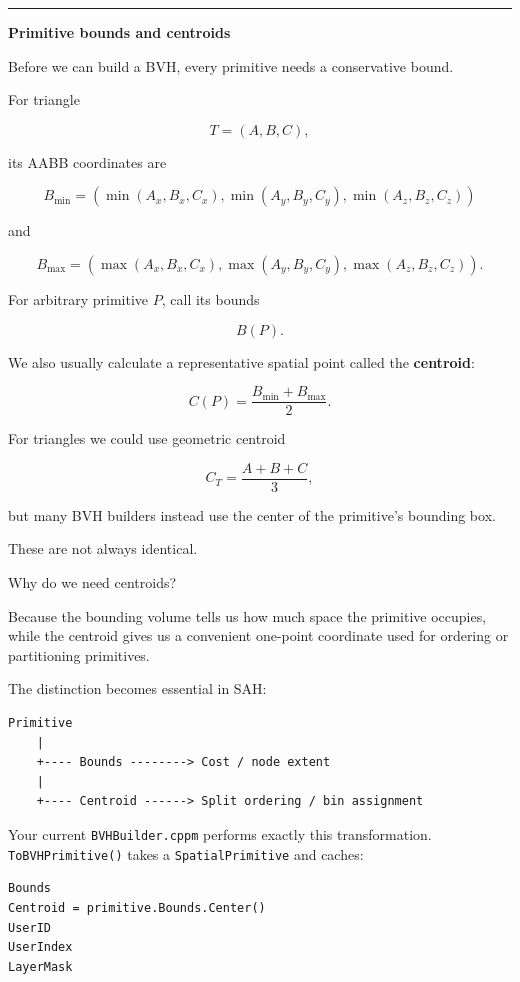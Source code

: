 \begin{center}\rule{0.5\linewidth}{0.5pt}\end{center}

\textbf{Primitive bounds and centroids}

Before we can build a BVH, every primitive needs a conservative bound.

For triangle

\[
T=(A,B,C),
\]

its AABB coordinates are

\[
B_{\min}=
\left(
\min(A_x,B_x,C_x),
\min(A_y,B_y,C_y),
\min(A_z,B_z,C_z)
\right)
\]

and

\[
B_{\max}=
\left(
\max(A_x,B_x,C_x),
\max(A_y,B_y,C_y),
\max(A_z,B_z,C_z)
\right).
\]

For arbitrary primitive \(P\), call its bounds

\[
B(P).
\]

We also usually calculate a representative spatial point called the \textbf{centroid}:

\[
C(P)=\frac{B_{\min}+B_{\max}}{2}.
\]

For triangles we could use geometric centroid

\[
C_T=\frac{A+B+C}{3},
\]

but many BVH builders instead use the center of the primitive's bounding box.

These are not always identical.

Why do we need centroids?

Because the bounding volume tells us how much space the primitive occupies, while the centroid gives us a convenient one-point coordinate used for ordering or partitioning primitives.

The distinction becomes essential in SAH:

\begin{verbatim}
Primitive
    |
    +---- Bounds --------> Cost / node extent
    |
    +---- Centroid ------> Split ordering / bin assignment
\end{verbatim}

Your current \texttt{BVHBuilder.cppm} performs exactly this transformation. \texttt{ToBVHPrimitive()} takes a \texttt{SpatialPrimitive} and caches:

\begin{verbatim}
Bounds
Centroid = primitive.Bounds.Center()
UserID
UserIndex
LayerMask
\end{verbatim}


